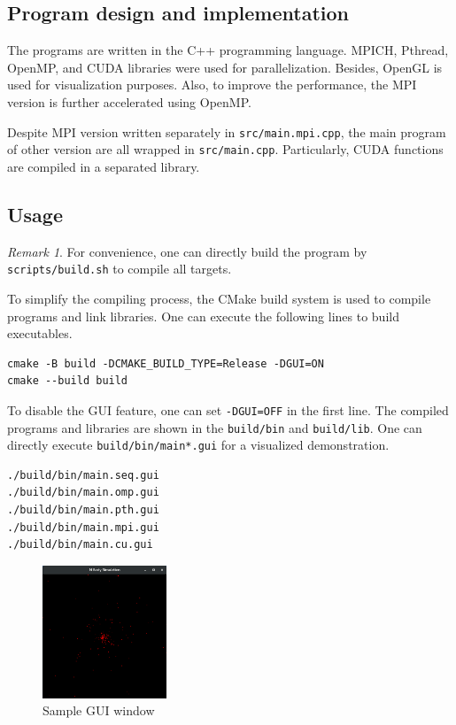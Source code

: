 \documentclass[twoside,12pt]{article}
\theoremstyle{definition}
\theoremstyle{remark}
\newtheorem*{remark}{Remark}
\begin{document}
\subsection{Program design and implementation}
The programs are written in the C++ programming language.
MPICH, Pthread, OpenMP, and CUDA libraries were used for parallelization.
Besides, OpenGL is used for visualization purposes.
Also, to improve the performance, the MPI version is further accelerated
using OpenMP.

Despite MPI version written separately in \lstinline|src/main.mpi.cpp|, 
the main program of other version are all wrapped
in \lstinline|src/main.cpp|.
Particularly, CUDA functions are compiled in a separated library.


\subsection{Usage}
\begin{remark}
For convenience, one can directly build the program by \lstinline|scripts/build.sh|
to compile all targets.
\end{remark}
To simplify the compiling process, the CMake build system is used
to compile programs and link libraries.
One can execute the following lines to build executables.
\begin{lstlisting}[style=sh]
cmake -B build -DCMAKE_BUILD_TYPE=Release -DGUI=ON
cmake --build build
\end{lstlisting}
To disable the GUI feature, one can set \lstinline|-DGUI=OFF| in the first line.
The compiled programs and libraries are shown in the \lstinline|build/bin| and
\lstinline|build/lib|.
One can directly execute \lstinline|build/bin/main*.gui| for a visualized demonstration.
\begin{lstlisting}[style=sh]
./build/bin/main.seq.gui
./build/bin/main.omp.gui
./build/bin/main.pth.gui
./build/bin/main.mpi.gui
./build/bin/main.cu.gui
\end{lstlisting}

\begin{figure}[h!]
    \centering
    \includegraphics[width=0.33\textwidth]{../demo.png}
    \caption{Sample GUI window}
    \label{fig:image}
\end{figure}
\end{document}
